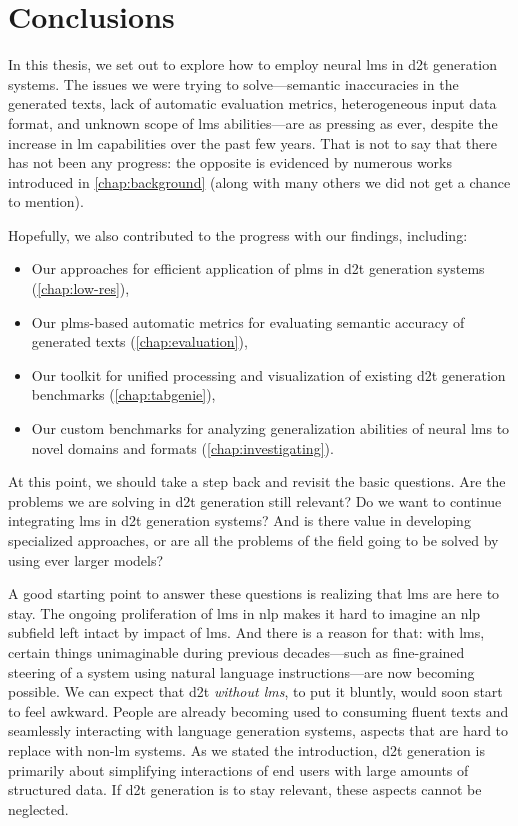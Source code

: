 
\chapter{Conclusions}
\label{chap:conclusions}

In this thesis, we set out to explore how to employ neural \acp{lm} in \ac{d2t} generation systems. The issues we were trying to solve---semantic inaccuracies in the generated texts, lack of automatic evaluation metrics, heterogeneous input data format, and unknown scope of \acp{lm} abilities---are as pressing as ever, despite the increase in \ac{lm} capabilities over the past few years. That is not to say that there has not been any progress: the opposite is evidenced by numerous works introduced in \autoref{chap:background} (along with many others we did not get a chance to mention).


Hopefully, we also contributed to the progress with our findings, including:
\begin{itemize}
    \item Our approaches for efficient application of \acp{plm} in \ac{d2t} generation systems (\autoref{chap:low-res}),
    \item Our \acp{plm}-based automatic metrics for evaluating semantic accuracy of generated texts (\autoref{chap:evaluation}),
    \item Our toolkit for unified processing and visualization of existing \ac{d2t} generation benchmarks (\autoref{chap:tabgenie}),
    \item Our custom benchmarks for analyzing generalization abilities of neural \acp{lm} to novel domains and formats (\autoref{chap:investigating}).
\end{itemize}

At this point, we should take a step back and revisit the basic questions. Are the problems we are solving in \ac{d2t} generation still relevant? Do we want to continue integrating \acp{lm} in \ac{d2t} generation systems? And is there value in developing specialized approaches, or are all the problems of the field going to be solved by using ever larger models?

A good starting point to answer these questions is realizing that \acp{lm} are here to stay. The ongoing proliferation of \acp{lm} in \ac{nlp} makes it hard to imagine an \ac{nlp} subfield left intact by impact of \acp{lm}. And there is a reason for that: with \acp{lm}, certain things unimaginable during previous decades---such as fine-grained steering of a system using natural language instructions---are now becoming possible. We can expect that \ac{d2t} \emph{without \acp{lm}}, to put it bluntly, would soon start to feel awkward. People are already becoming used to consuming fluent texts and seamlessly interacting with language generation systems, aspects that are hard to replace with non-\ac{lm} systems. As we stated the introduction, \ac{d2t} generation is primarily about simplifying interactions of end users with large amounts of structured data. If \ac{d2t} generation is to stay relevant, these aspects cannot be neglected.


